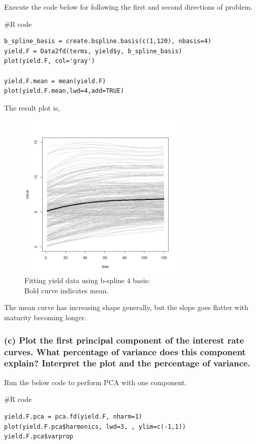 \documentclass{article}
\newenvironment{Rcode}%
{%
    \begin{mdframed}
    \#R code
    \begin{small}
}
{%
    \end{small}
    \end{mdframed}
}
\begin{document}
Execute the code below for following the first and second directions of problem.
\begin{Rcode}
    \begin{verbatim}
b_spline_basis = create.bspline.basis(c(1,120), nbasis=4)
yield.F = Data2fd(terms, yield$y, b_spline_basis)
plot(yield.F, col='gray')

yield.F.mean = mean(yield.F)
plot(yield.F.mean,lwd=4,add=TRUE)
    \end{verbatim}
\end{Rcode}
The result plot is,
\begin{figure}[hh]
    \centering
    \includegraphics[height=8cm]{yield_bspline4fit}
    \caption{Fitting yield data using b-spline 4 basis:\\Bold curve indicates mean.}
\end{figure}
The mean curve has increasing shape generally, but the slope goes flatter with maturity becoming longer.

\newpage
\subsubsection*{(c) Plot the first principal component of the interest rate curves. What percentage of variance does this component explain? Interpret the plot and the percentage of variance.}
Run the below code to perform PCA with one component.
\begin{Rcode}
    \begin{verbatim}
yield.F.pca = pca.fd(yield.F, nharm=1)
plot(yield.F.pca$harmonics, lwd=3, , ylim=c(-1,1))
yield.F.pca$varprop
    \end{verbatim}
\end{Rcode}
\end{document}
